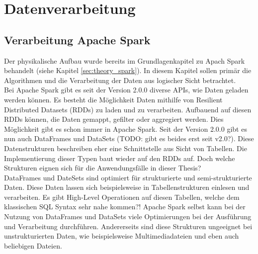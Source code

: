 \chapter{Datenverarbeitung}
\label{ch:data_processing}

\section{Verarbeitung Apache Spark\texttrademark}
Der physikalische Aufbau wurde bereits im Grundlagenkapitel zu Apach Spark behandelt (siehe Kapitel \ref{sec:theory_spark}). In diesem Kapitel sollen primär die Algorithmen und die Verarbeitung der Daten aus logischer Sicht betrachtet.\\ 

\noindent
Bei Apache Spark gibt es seit der Version 2.0.0 diverse APIs, wie Daten geladen werden können. Es besteht die Möglichkeit Daten mithilfe von Resilient Distributed Datasets (RDDs) zu laden und zu verarbeiten. Aufbauend auf diesen RDDs können, die Daten gemappt, gefilter oder aggregiert werden. Dies Möglichkeit gibt es schon immer in Apache Spark. Seit der Version 2.0.0 gibt es nun auch DataFrames und DataSets (TODO: gibt es beides erst seit v2.0?). Diese Datenstrukturen beschreiben eher eine Schnittstelle aus Sicht von Tabellen. Die Implementierung dieser Typen baut wieder auf den RDDs auf. Doch welche Strukturen eignen sich für die Anwendungsfälle in dieser Thesis? \\

\noindent
DataFrames und DateSets sind optimiert für strukturierte und semi-strukturierte Daten. Diese Daten lassen sich beispielsweise in Tabellenstrukturen einlesen und verarbeiten. Es gibt High-Level Operationen auf diesen Tabellen, welche dem klassischen SQL Syntax sehr nahe kommen?! Apache Spark selbst kann bei der Nutzung von DataFrames und DataSets viele Optimierungen bei der Ausführung und Verarbeitung durchführen. Andererseits sind diese Strukturen ungeeignet bei unstrukturierten Daten, wie beispielsweise Multimediadateien und eben auch beliebigen Dateien.\cite[S. 66 ff.]{data_processing_spark2}\\

